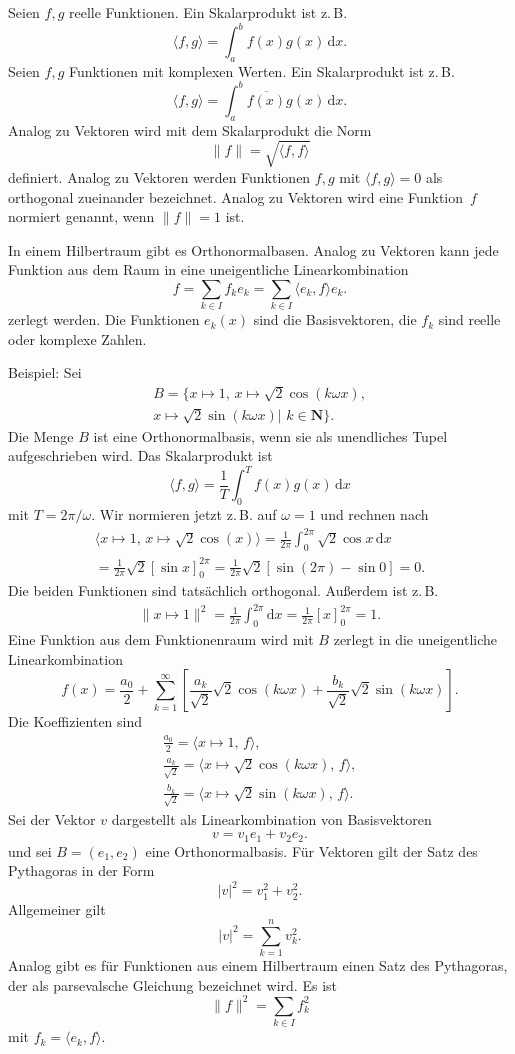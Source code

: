 \documentclass[a4paper,10pt,fleqn,twocolumn,twoside]{article}
\begin{document}
Seien $f,g$ reelle Funktionen. Ein Skalarprodukt ist z.\,B.
\[\langle f,g\rangle = \int_a^b f(x)g(x)\,\mathrm dx.\]
Seien $f,g$ Funktionen mit komplexen Werten.
Ein Skalarprodukt ist z.\,B.
\[\langle f,g\rangle = \int_a^b \overline{f(x)}g(x)\,\mathrm dx.\]
Analog zu Vektoren wird mit dem Skalarprodukt die Norm
\[\|f\| = \sqrt{\langle f,f\rangle}\]
definiert. Analog zu Vektoren werden Funktionen $f,g$ mit
$\langle f,g\rangle=0$ als orthogonal zueinander bezeichnet.
Analog zu Vektoren wird eine Funktion~$f$ normiert genannt,
wenn $\|f\|=1$ ist.

In einem Hilbertraum gibt es Orthonormalbasen. Analog zu Vektoren
kann jede Funktion aus dem Raum in eine uneigentliche
Linearkombination
\[f = \sum_{k\in I} f_ke_k = \sum_{k\in I} \langle e_k,f\rangle e_k.\]
zerlegt werden. Die Funktionen $e_k(x)$ sind die Basisvektoren,
die $f_k$ sind reelle oder komplexe Zahlen.

Beispiel: Sei
\begin{gather*}
B=\{x\mapsto 1,\,x\mapsto\sqrt{2}\cos(k\omega x),\\
x\mapsto\sqrt{2}\sin(k\omega x)|\,\,k\in\mathbf N\}.
\end{gather*}
Die Menge $B$ ist eine Orthonormalbasis, wenn sie als unendliches
Tupel aufgeschrieben wird. Das Skalarprodukt ist
\[\langle f,g\rangle = \frac{1}{T}\int_0^T f(x)g(x)\,\mathrm dx\]
mit $T=2\pi/\omega$. Wir normieren jetzt z.\,B. auf $\omega=1$ und
rechnen nach
\begin{gather*}
\langle x\mapsto 1,\,x\mapsto\sqrt{2}\cos(x)\rangle
= \frac{1}{2\pi}\int_0^{2\pi} \sqrt{2}\cos x\,\mathrm dx\\
= \frac{1}{2\pi}\sqrt{2}[\sin x]_0^{2\pi}
= \frac{1}{2\pi}\sqrt{2}[\sin(2\pi)-\sin 0] = 0.
\end{gather*}
Die beiden Funktionen sind tatsächlich orthogonal. Außerdem ist z.\,B.
\begin{gather*}
\|x\mapsto 1\|^2= \frac{1}{2\pi}\int_0^{2\pi} \mathrm dx
= \frac{1}{2\pi}[x]_0^{2\pi}=1.
\end{gather*}
Eine Funktion aus dem Funktionenraum wird mit $B$ zerlegt in die
uneigentliche Linearkombination
\[f(x) = \frac{a_0}{2}+\sum_{k=1}^\infty
[\frac{a_k}{\sqrt{2}}\sqrt{2}\cos(k\omega x)
+\frac{b_k}{\sqrt{2}}\sqrt{2}\sin(k\omega x)].\]
Die Koeffizienten sind
\begin{gather*}
\frac{a_0}{2}
= \langle x\mapsto 1,\,f\rangle,\\
\frac{a_k}{\sqrt{2}}
= \langle x\mapsto \sqrt{2}\cos(k\omega x),\,f\rangle,\\
\frac{b_k}{\sqrt{2}}
= \langle x\mapsto \sqrt{2}\sin(k\omega x),\,f\rangle.
\end{gather*}
%
Sei der Vektor $v$ dargestellt als Linearkombination von
Basisvektoren
\[v = v_1e_1+v_2e_2.\]
und sei $B=(e_1,e_2)$ eine Orthonormalbasis.
Für Vektoren gilt der Satz des Pythagoras in der Form
\[|v|^2 = v_1^2+v_2^2.\]
Allgemeiner gilt
\[|v|^2 = \sum_{k=1}^n v_k^2.\]
Analog gibt es für Funktionen aus einem Hilbertraum einen Satz des
Pythagoras, der als
parsevalsche Gleichung bezeichnet wird. Es ist
\[\|f\|^2 = \sum_{k\in I} f_k^2\]
mit $f_k=\langle e_k,f\rangle$.
\end{document}
